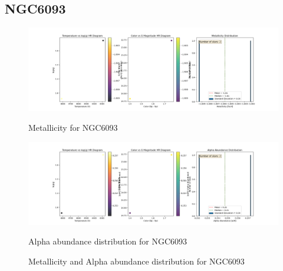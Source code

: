 \documentclass[a4paper,12pt]{article}
\begin{document}
\subsection{NGC6093}
\begin{figure}[H]
    \centering
    \begin{minipage}[b]{0.8\textwidth}
        \centering
        \includegraphics[width=\textwidth]{NGC6093_metalicity.png}
        \caption{Metallicity for NGC6093}
        \label{fig:NGC6093_metalicity}
    \end{minipage}
    \hfill
    \begin{minipage}[b]{0.8\textwidth}
        \centering
        \includegraphics[width=\textwidth]{NGC6093_alpha.png}
        \caption{Alpha abundance distribution for NGC6093}
        \label{fig:NGC6093_alpha}
    \end{minipage}
    \caption{Metallicity and Alpha abundance distribution for NGC6093}
    \label{fig:NGC6093_combined}
\end{figure}
\clearpage
\end{document}
